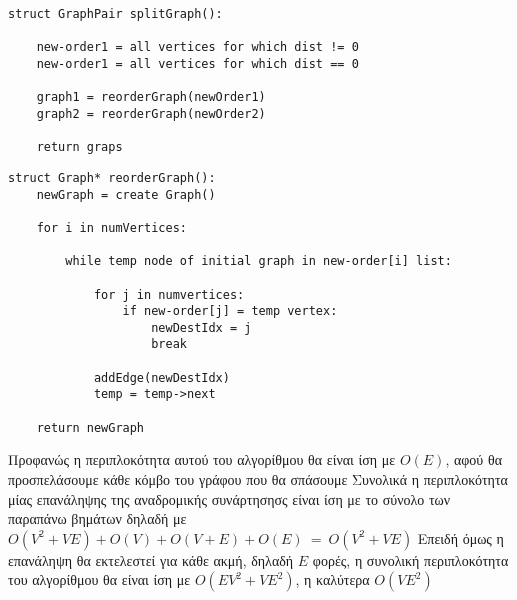 \documentclass{article}
\begin{document}
\begin{lstlisting}
struct GraphPair splitGraph():

	new-order1 = all vertices for which dist != 0
	new-order1 = all vertices for which dist == 0

  	graph1 = reorderGraph(newOrder1)
  	graph2 = reorderGraph(newOrder2)
  
	return graps

\end{lstlisting}
\begin{lstlisting}
struct Graph* reorderGraph():
	newGraph = create Graph()

	for i in numVertices:

		while temp node of initial graph in new-order[i] list: 
			
			for j in numvertices:
				if new-order[j] = temp vertex:
					newDestIdx = j
					break

			addEdge(newDestIdx)
			temp = temp->next

	return newGraph

\end{lstlisting}\bigbreak{}

Προφανώς η περιπλοκότητα αυτού του αλγορίθμου θα είναι ίση με $O(E)$, αφού θα προσπελάσουμε κάθε κόμβο του γράφου που θα σπάσουμε
Συνολικά η περιπλοκότητα μίας επανάληψης της αναδρομικής συνάρτησησς είναι ίση με το σύνολο των παραπάνω βημάτων δηλαδή με
$O(V^2 + VE) + O(V) + O(V + E) + O(E) \ = \ O(V^2 + VE)$ Επειδή όμως η επανάληψη θα εκτελεστεί για κάθε ακμή, δηλαδή $E$ φορές,
η συνολική περιπλοκότητα του αλγορίθμου θα είναι ίση με $O(ΕV^2 + VE^2)$, η καλύτερα $O(VE^2)$\bigbreak
\end{document}

